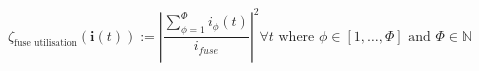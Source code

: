 \begin{equation}
	\zeta_\text{fuse utilisation}(\textbf{i}(t)) :=%
	\left|\frac{\sum_{\phi=1}^{\Phi}{i_\phi(t)}}{i_{fuse}}\right|^2 \forall t%
	\text{ where } \phi \in [1, \dots, \Phi]%
	\text{ and } \Phi \in \mathbb{N}
	\label{ch1:equ:fuse-utilisation}
\end{equation}